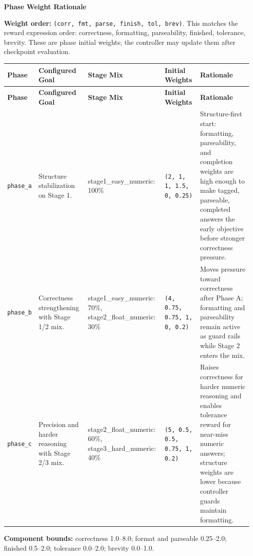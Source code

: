 \documentclass[10pt]{article}
\begin{document}
\begin{center}
{\LARGE \textbf{Phase Weight Rationale}}\\[0.75em]
\end{center}
\noindent\textbf{Weight order:} \texttt{(corr, fmt, parse, finish, tol, brev)}. This matches the reward expression order: correctness, formatting, parseability, finished, tolerance, brevity. These are phase initial weights; the controller may update them after checkpoint evaluation.
\vspace{0.45em}
\renewcommand{\arraystretch}{1.13}
\setlength{\tabcolsep}{3pt}
\scriptsize
\begin{longtable}{L{0.07\textwidth} L{0.18\textwidth} L{0.19\textwidth} L{0.16\textwidth} L{0.34\textwidth}}
\toprule
\textbf{Phase} & \textbf{Configured Goal} & \textbf{Stage Mix} & \textbf{Initial Weights} & \textbf{Rationale} \\
\midrule
\endfirsthead
\toprule
\textbf{Phase} & \textbf{Configured Goal} & \textbf{Stage Mix} & \textbf{Initial Weights} & \textbf{Rationale} \\
\midrule
\endhead
\texttt{phase\_a} &
Structure stabilization on Stage 1. &
stage1\_easy\_numeric: 100\% &
\texttt{(2, 1, 1, 1.5, 0, 0.25)} &
Structure-first start: formatting, parseability, and completion weights are high enough to make tagged, parseable, completed answers the early objective before stronger correctness pressure. \\
\midrule
\texttt{phase\_b} &
Correctness strengthening with Stage 1/2 mix. &
stage1\_easy\_numeric: 70\%, stage2\_float\_numeric: 30\% &
\texttt{(4, 0.75, 0.75, 1, 0, 0.2)} &
Moves pressure toward correctness after Phase A; formatting and parseability remain active as guard rails while Stage 2 enters the mix. \\
\midrule
\texttt{phase\_c} &
Precision and harder reasoning with Stage 2/3 mix. &
stage2\_float\_numeric: 60\%, stage3\_hard\_numeric: 40\% &
\texttt{(5, 0.5, 0.5, 0.75, 1, 0.2)} &
Raises correctness for harder numeric reasoning and enables tolerance reward for near-miss numeric answers; structure weights are lower because controller guards maintain formatting. \\
\bottomrule
\end{longtable}
\vspace{0.35em}
\noindent\textbf{Component bounds:} correctness 1.0--8.0; format and parseable 0.25--2.0; finished 0.5--2.0; tolerance 0.0--2.0; brevity 0.0--1.0.
\end{document}
